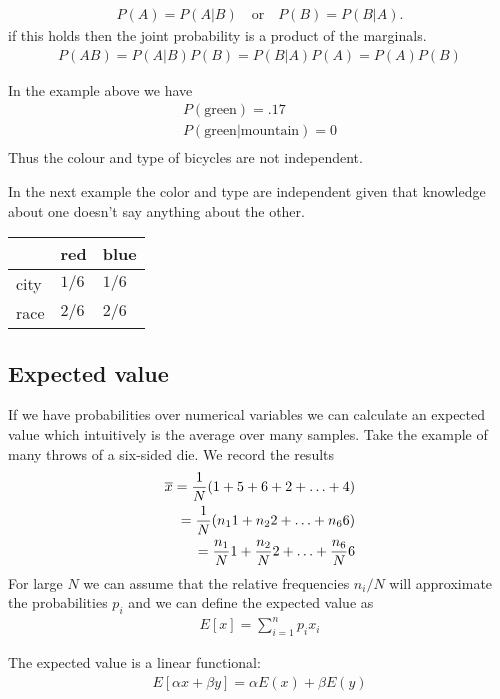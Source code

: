 \begin{align}
   P(A)  = P(A|B) \quad \text{or} \quad P(B) = P(B|A).
\end{align}
if this holds then the joint probability is a product of the marginals.
\begin{align}
  P(AB) = P(A|B)P(B) = P(B|A)P(A) =  P(A)P(B) 
\end{align}

In the example above we have \begin{align}
  P(\text{green}) = .17\\
  P(\text{green}|\text{mountain}) =0 \\  
\end{align}
Thus the colour and type of bicycles are not independent.

In the next example the color and type are independent given that knowledge about one doesn't say anything about the other.
\begin{center}
\begin{tabular}{lll}
    & red & blue \\
    \hline
    city & $1/6$ & $1/6$ \\
    race & $2/6$ & $2/6$ \\
\end{tabular} 
\end{center}

\subsection{Expected value}
If we have probabilities over numerical variables we can calculate an expected value which intuitively is the average over many samples.
Take the example of many throws of a six-sided die. We record the results
\begin{align}
  \overline{x}   = \frac{1}{N}(1+5+6+2+\hdots +4)\\
            = \frac{1}{N}(n_{1}1+n_{2}2+\hdots +n_{6}6)\\
            = \frac{n_{1}}{N}1+\frac{n_{2}}{N}2+\hdots +\frac{n_{6}}{N}6
\end{align}
For large $N$ we can assume that the relative frequencies $n_i/N$ will approximate the probabilities $p_i$ and we can define the expected value as 
\begin{align}
   E[x] = \sum_{i=1}^{n}p_{i}x_{i}
\end{align}

The expected value is a linear functional:
\begin{align}
  E[\alpha x + \beta y] = \alpha E(x) + \beta E(y)  
\end{align}

